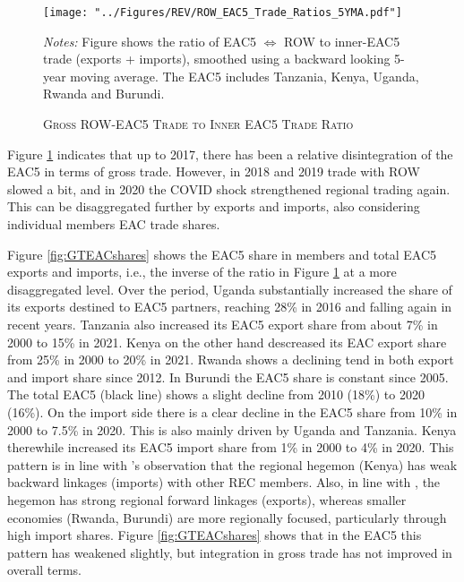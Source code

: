 \documentclass[a4paper]{article}
\begin{document}
\begin{figure}[h!] \vspace{-1mm}
\centering
\caption{\label{fig:EAC_ROW_Ratios} \textsc{Gross ROW-EAC5 Trade to Inner EAC5 Trade Ratio}}
\vspace{2mm}
\texttt{[image: "../Figures/REV/ROW\_EAC5\_Trade\_Ratios\_5YMA.pdf"]} \\
\raggedright
\scriptsize 
\emph{Notes:} Figure shows the ratio of EAC5 $\Leftrightarrow$ ROW to inner-EAC5 trade (exports + imports), smoothed using a backward looking 5-year moving average. The EAC5 includes Tanzania, Kenya, Uganda, Rwanda and Burundi.
\vspace{-10mm}
\end{figure}
\FloatBarrier

Figure \ref{fig:EAC_ROW_Ratios} indicates that up to 2017, there has been a relative disintegration of the EAC5 in terms of gross trade. However, in 2018 and 2019 trade with ROW slowed a bit, and in 2020 the COVID shock strengthened regional trading again. %
This can be disaggregated further by exports and imports, also considering individual members EAC trade shares. \newline 

Figure \ref{fig:GTEACshares} shows the EAC5 share in members and total EAC5 exports and imports, i.e., the inverse of the ratio in Figure \ref{fig:EAC_ROW_Ratios} at a more disaggregated level. Over the period, Uganda substantially increased the share of its exports destined to EAC5 partners, reaching 28\% in 2016 and falling again in recent years. Tanzania also increased its EAC5 export share from about 7\% in 2000 to 15\% in 2021. Kenya on the other hand descreased its EAC export share from 25\% in 2000 to 20\% in 2021. Rwanda shows a declining tend in both export and import share since 2012. In Burundi the EAC5 share is constant since 2005. The total EAC5 (black line) shows a slight decline from 2010 (18\%) to 2020 (16\%). On the import side there is a clear decline in the EAC5 share from 10\% in 2000 to 7.5\% in 2020. This is also mainly driven by Uganda and Tanzania. Kenya therewhile increased its EAC5 import share from 1\% in 2000 to 4\% in 2020. This pattern is in line with \citet{obasaju2021regional}'s observation that the regional hegemon (Kenya) has weak backward linkages (imports) with other REC members. Also, in line with \citet{engel2016sacu}, the hegemon has strong regional forward linkages (exports), whereas smaller economies (Rwanda, Burundi) are more regionally focused, particularly through high import shares. Figure \ref{fig:GTEACshares} shows that in the EAC5 this pattern has weakened slightly, but integration in gross trade has not improved in overall terms. 
\end{document}
